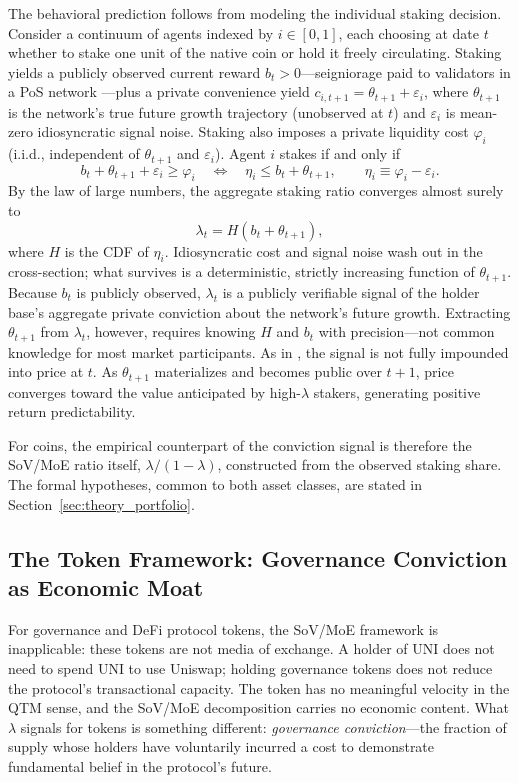 \documentclass[12pt]{article}
\begin{document}
The behavioral prediction follows from modeling the individual staking decision. Consider
a continuum of agents indexed by $i \in [0,1]$, each choosing at date $t$ whether to
stake one unit of the native coin or hold it freely circulating. Staking yields a publicly
observed current reward $b_t > 0$---seigniorage paid to validators in a PoS network
\citep{cong2024staking}---plus a private convenience yield $c_{i,t+1} = \theta_{t+1} +
\varepsilon_i$, where $\theta_{t+1}$ is the network's true future growth trajectory
(unobserved at $t$) and $\varepsilon_i$ is mean-zero idiosyncratic signal noise.
Staking also imposes a private liquidity cost $\varphi_i$ (i.i.d., independent of
$\theta_{t+1}$ and $\varepsilon_i$). Agent $i$ stakes if and only if
\[
b_t + \theta_{t+1} + \varepsilon_i \geq \varphi_i \quad \Longleftrightarrow \quad
\eta_i \leq b_t + \theta_{t+1}, \qquad \eta_i \equiv \varphi_i - \varepsilon_i.
\]
By the law of large numbers, the aggregate staking ratio converges almost surely to
\[
\lambda_t = H(b_t + \theta_{t+1}),
\]
where $H$ is the CDF of $\eta_i$. Idiosyncratic cost and signal noise wash out in the
cross-section; what survives is a deterministic, strictly increasing function of
$\theta_{t+1}$. Because $b_t$ is publicly observed, $\lambda_t$ is a publicly verifiable
signal of the holder base's aggregate private conviction about the network's future growth.
Extracting $\theta_{t+1}$ from $\lambda_t$, however, requires knowing $H$ and $b_t$ with
precision---not common knowledge for most market participants. As in
\citet{grossman1980impossibility}, the signal is not fully impounded into price at $t$.
As $\theta_{t+1}$ materializes and becomes public over $t+1$, price converges toward the
value anticipated by high-$\lambda$ stakers, generating positive return predictability.

For coins, the empirical counterpart of the conviction signal is therefore the SoV/MoE
ratio itself, $\lambda/(1-\lambda)$, constructed from the observed staking share. The
formal hypotheses, common to both asset classes, are stated in
Section~\ref{sec:theory_portfolio}.

\subsection{The Token Framework: Governance Conviction as Economic Moat}
\label{sec:theory_tokens}

For governance and DeFi protocol tokens, the SoV/MoE framework is inapplicable: these
tokens are not media of exchange. A holder of UNI does not need to spend UNI to use
Uniswap; holding governance tokens does not reduce the protocol's transactional capacity.
The token has no meaningful velocity in the QTM sense, and the SoV/MoE decomposition
carries no economic content. What $\lambda$ signals for tokens is something different:
\textit{governance conviction}---the fraction of supply whose holders have voluntarily
incurred a cost to demonstrate fundamental belief in the protocol's future.
\end{document}
